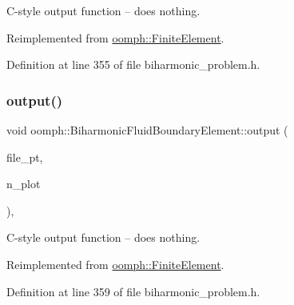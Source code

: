 C-\/style output function -- does nothing. 



Reimplemented from \hyperlink{classoomph_1_1FiniteElement_a72cddd09f8ddbee1a20a1ff404c6943e}{oomph\+::\+Finite\+Element}.



Definition at line 355 of file biharmonic\+\_\+problem.\+h.

\mbox{\label{classoomph_1_1BiharmonicFluidBoundaryElement_a41c4acc14c45cb120c33d02baf7a5189}} 
\subsubsection{\texorpdfstring{output()}{output()}\hspace{0.1cm}{\footnotesize\ttfamily [4/4]}}
{\footnotesize\ttfamily void oomph\+::\+Biharmonic\+Fluid\+Boundary\+Element\+::output (\begin{DoxyParamCaption}\item[{F\+I\+LE $\ast$}]{file\+\_\+pt,  }\item[{const unsigned \&}]{n\+\_\+plot }\end{DoxyParamCaption})\hspace{0.3cm}{\ttfamily [inline]}, {\ttfamily [virtual]}}



C-\/style output function -- does nothing. 



Reimplemented from \hyperlink{classoomph_1_1FiniteElement_adfaee690bb0608f03320eeb9d110d48c}{oomph\+::\+Finite\+Element}.



Definition at line 359 of file biharmonic\+\_\+problem.\+h.

\mbox{\label{classoomph_1_1BiharmonicFluidBoundaryElement_a9a639b1f556286e525b221ed9a96e7f5}} 
